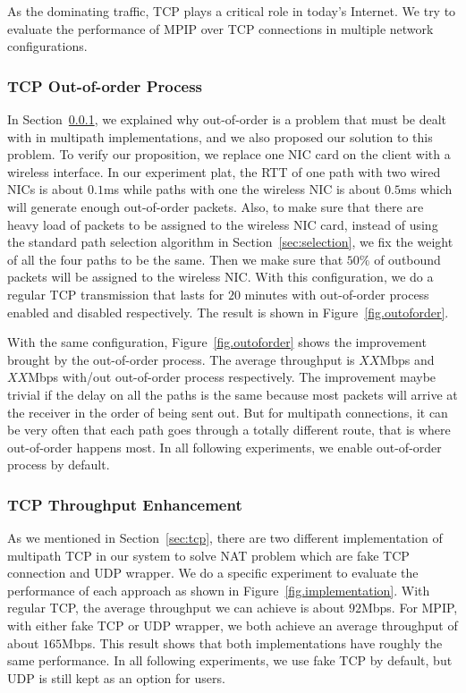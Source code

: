 As the dominating traffic, TCP plays a critical role in today's Internet. We try to evaluate the performance of MPIP over TCP connections in multiple network configurations. 

\subsubsection{TCP Out-of-order Process}
\label{sec:outoforder}

In Section~\ref{sec:outoforder}, we explained why out-of-order is a problem that must be dealt with in multipath implementations, and we also proposed our solution to this problem. To verify our proposition, we replace one NIC card on the client with a wireless interface. In our experiment plat, the RTT of one path with two wired NICs is about $0.1$ms while paths with one the wireless NIC is about $0.5$ms which will generate enough out-of-order packets. Also, to make sure that there are heavy load of packets to be assigned to the wireless NIC card, instead of using the standard path selection algorithm in Section~\ref{sec:selection}, we fix the weight of all the four paths to be the same. Then we make sure that $50\%$ of outbound packets will be assigned to the wireless NIC.
With this configuration, we do a regular TCP transmission that lasts for $20$ minutes with out-of-order process enabled and disabled respectively. The result is shown in Figure~\ref{fig.outoforder}.

With the same configuration, Figure~\ref{fig.outoforder} shows the improvement brought by the out-of-order process. The average throughput is $XX$Mbps and $XX$Mbps with/out out-of-order process respectively. The improvement maybe trivial if the delay on all the paths is the same because most packets will arrive at the receiver in the order of being sent out. But for multipath connections, it can be very often that each path goes through a totally different route, that is where out-of-order happens most. In all following experiments, we enable out-of-order process by default.

\subsubsection{TCP Throughput Enhancement}
\label{sec:tcptp}

As we mentioned in Section~\ref{sec:tcp}, there are two different implementation of multipath TCP in our system to solve NAT problem which are fake TCP connection and UDP wrapper. We do a specific experiment to evaluate the performance of each approach as shown in Figure~\ref{fig.implementation}. With regular TCP, the average throughput we can achieve is about $92$Mbps. For MPIP, with either fake TCP or UDP wrapper, we both achieve an average throughput of about $165$Mbps. This result shows that both implementations have roughly the same performance. In all following experiments, we use fake TCP by default, but UDP is still kept as an option for users.



